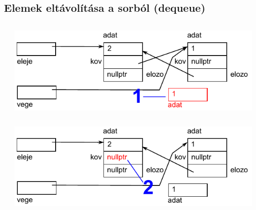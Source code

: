 \subsection{Elemek eltávolítása a sorból (dequeue)}
\begin{frame}
  \begin{columns}[c]
      \scriptsize
      \begin{exampleblock}{}
        \scriptsize
        
      \end{exampleblock}
      \includegraphics[width=\textwidth]{sor/sor20.pdf}
  \end{columns}
\end{frame}

\begin{frame}
  \begin{columns}[c]
      \scriptsize
      \begin{exampleblock}{}
        \scriptsize
        
      \end{exampleblock}
      \includegraphics[width=\textwidth]{sor/sor21.pdf}
  \end{columns}
\end{frame}

